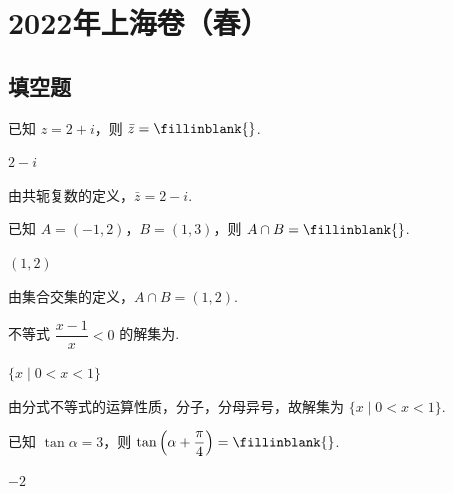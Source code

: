 

\chapter{2022年上海卷（春）}

\section{填空题}

\begin{problem}
已知 \(z=2+i\)，则 \(\bar z=\fillinblank{}\).
\end{problem}

\begin{answer}
\(2-i\)
\end{answer}

\begin{solution}
由共轭复数的定义，\(\bar z=2-i\).
\end{solution}

\begin{problem}
已知 \(A=(-1,2)\)，\(B=(1,3)\)，则 \(A\cap B=\fillinblank{}\).
\end{problem}

\begin{answer}
\((1,2)\)
\end{answer}

\begin{solution}
由集合交集的定义，\(A\cap B=(1,2)\).
\end{solution}

\begin{problem}
不等式 \(\dfrac{x-1}{x}<0\) 的解集为\fillinblank{}.
\end{problem}

\begin{answer}
\(\{x\mid 0<x<1\}\)
\end{answer}

\begin{solution}
由分式不等式的运算性质，分子，分母异号，故解集为 \(\{x\mid 0<x<1\}\).
\end{solution}

\begin{problem}
已知 \(\tan\alpha=3\)，则 \(\tan\left(\alpha+\dfrac\pi4\right)=\fillinblank{}\).
\end{problem}

\begin{answer}
\(-2\)
\end{answer}

